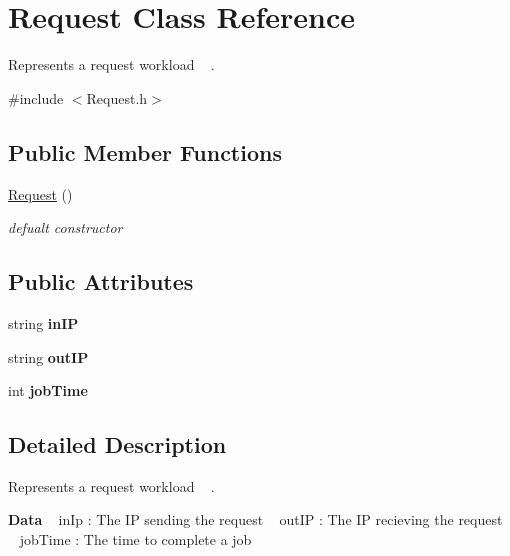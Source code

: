 \hypertarget{classRequest}{}\section{Request Class Reference}
\label{classRequest}


Represents a request workload ~\newline
.  




{\ttfamily \#include $<$Request.\+h$>$}

\subsection*{Public Member Functions}
\begin{DoxyCompactItemize}
\item 
\hyperlink{classRequest_afaf8d8928de7ffff8a3767589489bd33}{Request} ()
\begin{DoxyCompactList}\small\item\em defualt constructor \end{DoxyCompactList}\end{DoxyCompactItemize}
\subsection*{Public Attributes}
\begin{DoxyCompactItemize}
\item 
\mbox{\label{classRequest_ae392c6c23536abdb45784e31112458ac}} 
string {\bfseries in\+IP}
\item 
\mbox{\label{classRequest_ad7c456a510bf588b92a17ede4ae9ff73}} 
string {\bfseries out\+IP}
\item 
\mbox{\label{classRequest_a24731bb1eaf05b3115336191a71d99ae}} 
int {\bfseries job\+Time}
\end{DoxyCompactItemize}


\subsection{Detailed Description}
Represents a request workload ~\newline
. 

{\bfseries Data} ~\newline
in\+Ip \+: The IP sending the request ~\newline
 out\+IP \+: The IP recieving the request ~\newline
 job\+Time \+: The time to complete a job ~\newline


